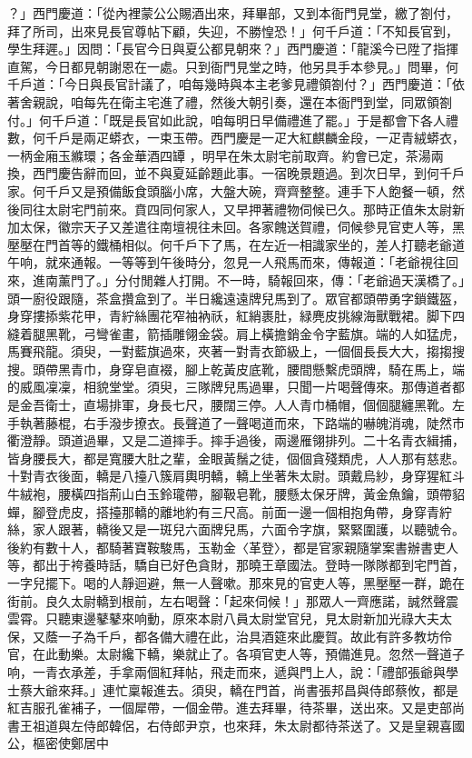 ？」西門慶道：「從內裡蒙公公賜酒出來，拜畢部，又到本衙門見堂，繳了劄付，拜了所司，出來見長官尊帖下顧，失迎，不勝惶恐！」何千戶道：「不知長官到，學生拜遲。」因問：「長官今日與夏公都見朝來？」西門慶道：「龍溪今已陞了指揮直駕，今日都見朝謝恩在一處。只到衙門見堂之時，他另具手本參見。」問畢，何千戶道：「今日與長官計議了，咱每幾時與本主老爹見禮領劄付？」西門慶道：「依著舍親說，咱每先在衛主宅進了禮，然後大朝引奏，還在本衙門到堂，同眾領劄付。」何千戶道：「既是長官如此說，咱每明日早備禮進了罷。」于是都會下各人禮數，何千戶是兩疋蟒衣，一束玉帶。西門慶是一疋大紅麒麟金段，一疋青絨蟒衣，一柄金廂玉縧環；各金華酒四罈 ，明早在朱太尉宅前取齊。約會已定，茶湯兩換，西門慶告辭而回，並不與夏延齡題此事。一宿晚景題過。到次日早，到何千戶家。何千戶又是預備飯食頭腦小席，大盤大碗，齊齊整整。連手下人飽餐一頓，然後同往太尉宅門前來。賁四同何家人，又早押著禮物伺候已久。那時正值朱太尉新加太保，徽宗天子又差遣往南壇視往未回。各家餽送賀禮，伺候參見官吏人等，黑壓壓在門首等的鐵桶相似。何千戶下了馬，在左近一相識家坐的，差人打聽老爺道午响，就來通報。一等等到午後時分，忽見一人飛馬而來，傳報道：「老爺視往回來，進南薰門了。」分付閒雜人打開。不一時，騎報回來，傳：「老爺過天漢橋了。」頭一廚役跟隨，茶盒攢盒到了。半日纔遠遠牌兒馬到了。眾官都頭帶勇字鎖鐵盔，身穿摟掭紫花甲，青紵絲團花窄袖衲祅，紅綃裹肚，緑麂皮挑線海獸戰裙。脚下四縫着腿黑靴，弓彎雀畫，箭插雕翎金袋。肩上橫擔銷金令字藍旗。端的人如猛虎，馬賽飛龍。須臾，一對藍旗過來，夾著一對青衣節級上，一個個長長大大，搊搊搜搜。頭帶黑青巾，身穿皂直裰，腳上乾黃皮底靴，腰間懸繫虎頭牌，騎在馬上，端的威風凜凜，相貌堂堂。須臾，三隊牌兒馬過畢，只聞一片喝聲傳來。那傳道者都是金吾衛士，直場排軍，身長七尺，腰闊三停。人人青巾桶帽，個個腿纏黑靴。左手執著藤棍，右手潑步撩衣。長聲道了一聲喝道而來，下路端的嚇魄消魂，陡然市衢澄靜。頭道過畢，又是二道摔手。摔手過後，兩邊雁翎排列。二十名青衣緝捕，皆身腰長大，都是寬腰大肚之輩，金眼黃鬚之徒，個個貪殘類虎，人人那有慈悲。十對青衣後面，轎是八擡八簇肩輿明轎，轎上坐著朱太尉。頭戴烏紗，身穿猩紅斗牛絨袍，腰橫四指荊山白玉鈴瓏帶，腳靸皂靴，腰懸太保牙牌，黃金魚鑰，頭帶貂蟬，腳登虎皮，搭擡那轎的離地約有三尺高。前面一邊一個相抱角帶，身穿青紵絲，家人跟著，轎後又是一斑兒六面牌兒馬，六面令字旗，緊緊圍護，以聽號令。後約有數十人，都騎著寶鞍駿馬，玉勒金〈革登〉，都是官家親隨掌案書辦書吏人等，都出于袴養時話，驕自已好色貪財，那曉王章國法。登時一隊隊都到宅門首，一字兒擺下。喝的人靜迴避，無一人聲嗽。那來見的官吏人等，黑壓壓一群，跪在街前。良久太尉轎到根前，左右喝聲：「起來伺候！」那眾人一齊應諾，誠然聲震雲霄。只聽東邊鼕鼕來响動，原來本尉八員太尉堂官兒，見太尉新加光祿大夫太保，又蔭一子為千戶，都各備大禮在此，治具酒筵來此慶賀。故此有許多教坊伶官，在此動樂。太尉纔下轎，樂就止了。各項官吏人等，預備進見。忽然一聲道子响，一青衣承差，手拿兩個紅拜帖，飛走而來，遞與門上人，說：「禮部張爺與學士蔡大爺來拜。」連忙稟報進去。須臾，轎在門首，尚書張邦昌與侍郎蔡攸，都是紅吉服孔雀補子，一個犀帶，一個金帶。進去拜畢，待茶畢，送出來。又是吏部尚書王祖道與左侍郎韓侶，右侍郎尹京，也來拜，朱太尉都待茶送了。又是皇親喜國公，樞密使鄭居中